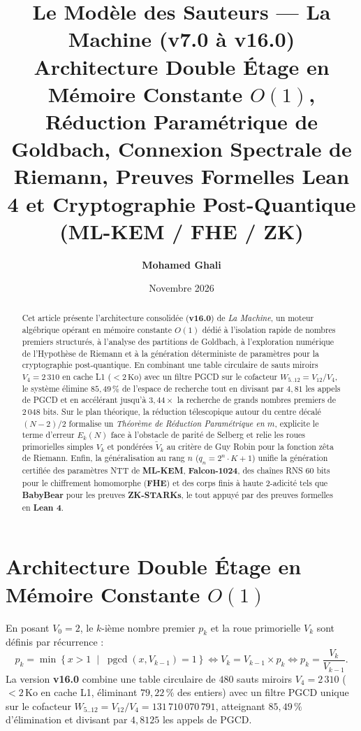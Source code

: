 \documentclass[11pt,a4paper]{article}
\title{\texorpdfstring{\textbf{\color{navy}Le Modèle des Sauteurs — La Machine (v7.0 à v16.0)}}{Le Modele des Sauteurs - La Machine (v7.0 a v16.0)}\\
\texorpdfstring{\large Architecture Double Étage en Mémoire Constante $O(1)$, Réduction Paramétrique de Goldbach, Connexion Spectrale de Riemann, Preuves Formelles Lean 4 et Cryptographie Post-Quantique (ML-KEM / FHE / ZK)}{Architecture Double Etage en Memoire Constante O(1)}}
\author{\textbf{Mohamed Ghali}}
\date{Novembre 2026}
\DeclareMathOperator{\pgcd}{pgcd}
\begin{document}
\maketitle

\begin{abstract}
Cet article présente l'architecture consolidée (\textbf{v16.0}) de \emph{La Machine}, un moteur algébrique opérant en mémoire constante $O(1)$ dédié à l'isolation rapide de nombres premiers structurés, à l'analyse des partitions de Goldbach, à l'exploration numérique de l'Hypothèse de Riemann et à la génération déterministe de paramètres pour la cryptographie post-quantique. En combinant une table circulaire de sauts miroirs $V_4 = 2\,310$ en cache L1 ($< 2\,\text{Ko}$) avec un filtre PGCD sur le cofacteur $W_{5..12} = V_{12}/V_4$, le système élimine $85{,}49\,\%$ de l'espace de recherche tout en divisant par $4{,}81$ les appels de PGCD et en accélérant jusqu'à $3{,}44\times$ la recherche de grands nombres premiers de $2\,048$ bits. Sur le plan théorique, la réduction télescopique autour du centre décalé $(N - 2)/2$ formalise un \emph{Théorème de Réduction Paramétrique en $m$}, explicite le terme d'erreur $E_k(N)$ face à l'obstacle de parité de Selberg et relie les roues primorielles simples $V_k$ et pondérées $\widetilde{V}_k$ au critère de Guy Robin pour la fonction zêta de Riemann. Enfin, la généralisation au rang $n$ ($q_n = 2^n \cdot K + 1$) unifie la génération certifiée des paramètres NTT de \textbf{ML-KEM}, \textbf{Falcon-1024}, des chaînes RNS 60 bits pour le chiffrement homomorphe (\textbf{FHE}) et des corps finis à haute 2-adicité tels que \textbf{BabyBear} pour les preuves \textbf{ZK-STARKs}, le tout appuyé par des preuves formelles en \textbf{Lean 4}.
\end{abstract}

\section{Architecture Double Étage en Mémoire Constante $O(1)$}

En posant $V_0 = 2$, le $k$-ième nombre premier $p_k$ et la roue primorielle $V_k$ sont définis par récurrence :
\begin{equation}
p_k = \min \left\{ x > 1 \;\middle|\; \pgcd(x, V_{k-1}) = 1 \right\} \iff V_k = V_{k-1} \times p_k \iff p_k = \frac{V_k}{V_{k-1}}.
\end{equation}
La version \textbf{v16.0} combine une table circulaire de $480$ sauts miroirs $V_4 = 2\,310$ ($< 2\,\text{Ko}$ en cache L1, éliminant $79{,}22\,\%$ des entiers) avec un filtre PGCD unique sur le cofacteur $W_{5..12} = V_{12}/V_4 = 131\,710\,070\,791$, atteignant $85{,}49\,\%$ d'élimination et divisant par $4{,}8125$ les appels de PGCD.
\end{document}
